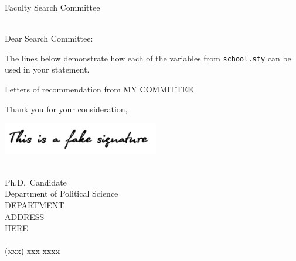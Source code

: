 \documentclass[12pt]{article}
\begin{document}
\thispagestyle{plain}

\pagestyle{empty}



Faculty Search Committee \\
\DepartmentName \\
\DepartmentAddress



Dear Search Committee:

\vfill

The lines below demonstrate how each of the variables from \texttt{school.sty} can be used in your statement.

\PositionName{}

\DepartmentName{}

\InstitutionName{}

Letters of recommendation from MY COMMITTEE \LetterMethod{}

\vfill

Thank you for your consideration,

\includegraphics[height=40pt]{../signature.png}

\Name{} \\
Ph.D.\ Candidate \\
Department of Political Science \\
DEPARTMENT \\
ADDRESS \\
HERE \\
 \\
(xxx) xxx-xxxx


\end{document}

